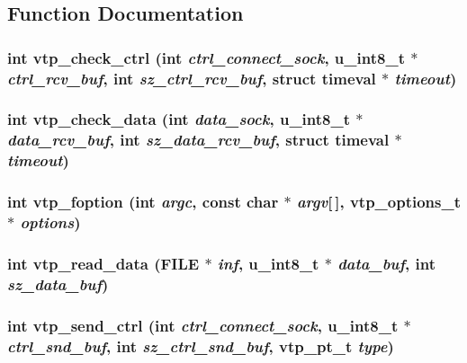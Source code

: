 \subsection{Function Documentation}
\subsubsection{\setlength{\rightskip}{0pt plus 5cm}int vtp\_\-check\_\-ctrl (int {\em ctrl\_\-connect\_\-sock}, u\_\-int8\_\-t $\ast$ {\em ctrl\_\-rcv\_\-buf}, int {\em sz\_\-ctrl\_\-rcv\_\-buf}, struct timeval $\ast$ {\em timeout})}\label{vtp_8c_a2}


\subsubsection{\setlength{\rightskip}{0pt plus 5cm}int vtp\_\-check\_\-data (int {\em data\_\-sock}, u\_\-int8\_\-t $\ast$ {\em data\_\-rcv\_\-buf}, int {\em sz\_\-data\_\-rcv\_\-buf}, struct timeval $\ast$ {\em timeout})}\label{vtp_8c_a3}


\subsubsection{\setlength{\rightskip}{0pt plus 5cm}int vtp\_\-foption (int {\em argc}, const char $\ast$ {\em argv}[$\,$], {\bf vtp\_\-options\_\-t} $\ast$ {\em options})}\label{vtp_8c_a1}


\subsubsection{\setlength{\rightskip}{0pt plus 5cm}int vtp\_\-read\_\-data (FILE $\ast$ {\em inf}, u\_\-int8\_\-t $\ast$ {\em data\_\-buf}, int {\em sz\_\-data\_\-buf})}\label{vtp_8c_a6}


\subsubsection{\setlength{\rightskip}{0pt plus 5cm}int vtp\_\-send\_\-ctrl (int {\em ctrl\_\-connect\_\-sock}, u\_\-int8\_\-t $\ast$ {\em ctrl\_\-snd\_\-buf}, int {\em sz\_\-ctrl\_\-snd\_\-buf}, {\bf vtp\_\-pt\_\-t} {\em type})}\label{vtp_8c_a4}


